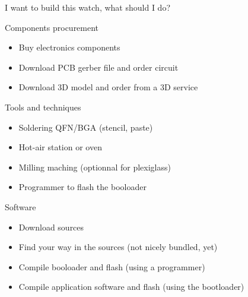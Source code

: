 \documentclass[compress,red]{beamer}
\begin{document}
\begin{frame}{I want to build this watch, what should I do?}

  \begin{block}{Components procurement}
    \begin{itemize}
    \item Buy electronics components
    \item Download PCB gerber file and order circuit
    \item Download 3D model and order from a 3D service
    \end{itemize}
  \end{block}

  \begin{block}{Tools and techniques}
    \begin{itemize}
    \item Soldering QFN/BGA (stencil, paste)
    \item Hot-air station or oven
    \item Milling maching (optionnal for plexiglass)
    \item Programmer to flash the booloader
    \end{itemize}
  \end{block}

  \begin{block}{Software}
    \begin{itemize}
    \item Download sources
    \item Find your way in the sources (not nicely bundled, yet)
    \item Compile booloader and flash (using a programmer)
    \item Compile application software and flash (using the bootloader)
    \end{itemize}
  \end{block}

  \note[item]{}

\end{frame}
\end{document}
